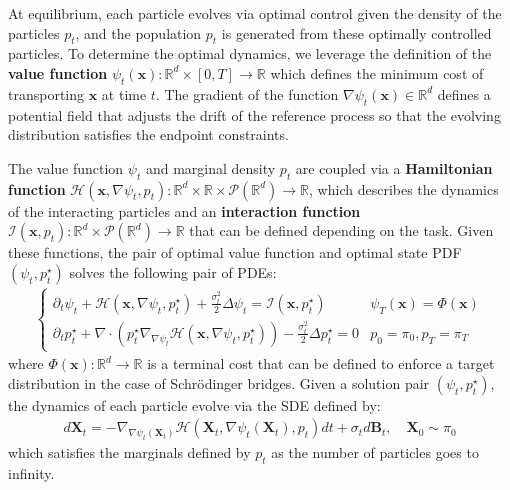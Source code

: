 \documentclass{article}
\newcommand{\boldtext}[1]{\textbf{\textcolor{MyGreen}{#1}}}
\begin{document}
At equilibrium, each particle evolves via optimal control given the density of the particles $p_t$, and the population $p_t$ is generated from these optimally controlled particles. To determine the optimal dynamics, we leverage the definition of the \textbf{value function} $\psi_t(\boldsymbol{x}): \mathbb{R}^d\times [0,T]\to \mathbb{R}$ which defines the minimum cost of transporting $\boldsymbol{x}$ at time $t$. The gradient of the function $\nabla \psi_t(\boldsymbol{x})\in \mathbb{R}^d$ defines a potential field that adjusts the drift of the reference process so that the evolving distribution satisfies the endpoint constraints. 

The value function $\psi_t$ and marginal density $p_t$ are coupled via a \boldtext{Hamiltonian function} $\mathcal{H}(\boldsymbol{x}, \nabla \psi_t, p_t):\mathbb{R}^d\times \mathbb{R}\times \mathcal{P}(\mathbb{R}^d)\to \mathbb{R}$, which describes the dynamics of the interacting particles and an \boldtext{interaction function} $\mathcal{I}(\boldsymbol{x},p_t):\mathbb{R}^d\times \mathcal{P}(\mathbb{R}^d)\to \mathbb{R}$ that can be defined depending on the task. Given these functions, the pair of optimal value function and optimal state PDF $(\psi_t, p^\star_t)$ solves the following pair of PDEs:
\begin{align}
    \begin{cases}
        \partial_t \psi_t+\mathcal{H}(\boldsymbol{x},\nabla \psi_t, p^\star_t)+\frac{\sigma^2_t}{2}\Delta \psi_t=\mathcal{I}(\boldsymbol{x},p_t^\star)  &\psi_T(\boldsymbol{x})=\Phi(\boldsymbol{x}) \\
        \partial_t p^\star_t+\nabla \cdot (p_t^\star \nabla_{\nabla \psi_t} \mathcal{H}(\boldsymbol{x},\nabla \psi_t, p^\star_t))-\frac{\sigma^2_t}{2}\Delta p^\star_t=0  &p_0=\pi_0, p_T=\pi_T
    \end{cases}\label{eq:meanfieldgame-pdes}
\end{align}
where $\Phi(\boldsymbol{x}):\mathbb{R}^d\to \mathbb{R}$ is a terminal cost that can be defined to enforce a target distribution in the case of Schrödinger bridges. Given a solution pair $(\psi_t,p^\star_t)$, the dynamics of each particle evolve via the SDE defined by:
\begin{align}
    d\boldsymbol{X}_t =-\nabla_{\nabla \psi_t(\boldsymbol{X}_t)} \mathcal{H}(\boldsymbol{X}_t, \nabla \psi_t(\boldsymbol{X}_t),p_t)dt+\sigma_td\boldsymbol{B}_t, \quad \boldsymbol{X}_0\sim \pi_0\label{eq:meanfieldgames-sde}
\end{align}
which satisfies the marginals defined by $p_t$ as the number of particles goes to infinity. 
\end{document}
